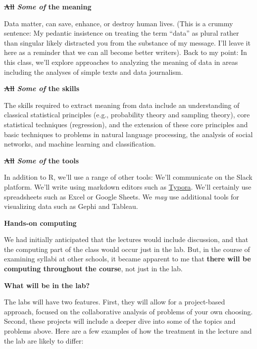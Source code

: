 \documentclass[]{book}
\theoremstyle{definition}
\theoremstyle{definition}
\theoremstyle{definition}
\theoremstyle{remark}
\begin{document}
\textbf{\sout{All} \emph{Some of} the meaning}

Data matter, can save, enhance, or destroy human lives. (This is a
crummy sentence: My pedantic insistence on treating the term ``data'' as
plural rather than singular likely distracted you from the substance of
my message. I'll leave it here as a reminder that we can all become
better writers). Back to my point: In this class, we'll explore
approaches to analyzing the meaning of data in areas including the
analyses of simple texts and data journalism.

\textbf{\sout{All} \emph{Some of} the skills}

The skills required to extract meaning from data include an
understanding of classical statistical principles (e.g., probability
theory and sampling theory), core statistical techniques (regression),
and the extension of these core principles and basic techniques to
problems in natural language processing, the analysis of social
networks, and machine learning and classification.

\textbf{\sout{All} \emph{Some of} the tools}

In addition to R, we'll use a range of other tools: We'll communicate on
the Slack platform. We'll write using markdown editors such as
\href{https://typora.io/}{Typora}. We'll certainly use spreadsheets such
as Excel or Google Sheets. We \emph{may} use additional tools for
visualizing data such as Gephi and Tableau.

\textbf{Hands-on computing}

We had initially anticipated that the lectures would include discussion,
and that the computing part of the class would occur just in the lab.
But, in the course of examining syllabi at other schools, it became
apparent to me that \textbf{there will be computing throughout the
course}, not just in the lab.

\textbf{What will be in the lab?}

The labs will have two features. First, they will allow for a
project-based approach, focused on the collaborative analysis of
problems of your own choosing. Second, these projects will include a
deeper dive into some of the topics and problems above. Here are a few
examples of how the treatment in the lecture and the lab are likely to
differ:
\end{document}
